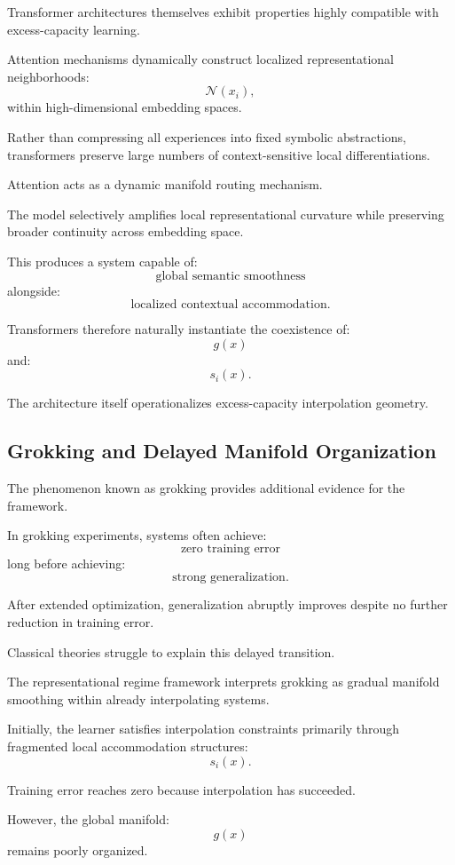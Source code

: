 \documentclass[12pt,a4paper]{article}
\begin{document}
Transformer architectures themselves exhibit properties highly compatible with excess-capacity learning.

Attention mechanisms dynamically construct localized representational neighborhoods:
\[
\mathcal{N}(x_i),
\]
within high-dimensional embedding spaces.

Rather than compressing all experiences into fixed symbolic abstractions, transformers preserve large numbers of context-sensitive local differentiations.

Attention acts as a dynamic manifold routing mechanism.

The model selectively amplifies local representational curvature while preserving broader continuity across embedding space.

This produces a system capable of:
\[
\text{global semantic smoothness}
\]
alongside:
\[
\text{localized contextual accommodation}.
\]

Transformers therefore naturally instantiate the coexistence of:
\[
g(x)
\]
and:
\[
s_i(x).
\]

The architecture itself operationalizes excess-capacity interpolation geometry.

\subsection{Grokking and Delayed Manifold Organization}

The phenomenon known as grokking provides additional evidence for the framework.

In grokking experiments, systems often achieve:
\[
\text{zero training error}
\]
long before achieving:
\[
\text{strong generalization}.
\]

After extended optimization, generalization abruptly improves despite no further reduction in training error.

Classical theories struggle to explain this delayed transition.

The representational regime framework interprets grokking as gradual manifold smoothing within already interpolating systems.

Initially, the learner satisfies interpolation constraints primarily through fragmented local accommodation structures:
\[
s_i(x).
\]

Training error reaches zero because interpolation has succeeded.

However, the global manifold:
\[
g(x)
\]
remains poorly organized.
\end{document}
